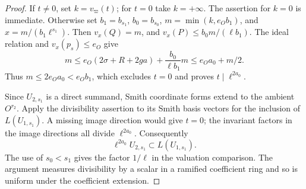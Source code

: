 \begin{proof}
If \(t\ne0\), set
\(k=v_\varpi(t)\); for \(t=0\) take \(k=+\infty\).
The assertion for \(k=0\) is immediate. Otherwise set
\(b_1=b_{s_1}\), \(b_0=b_{s_0}\),
\(m=\min(k,e_O b_1)\), and \(x=m/(b_1\ell^{s_1})\). Then
\(v_x(Q)=m\), and \(v_x(P)\le b_0 m/(\ell b_1)\).
The ideal relation and \(v_x(p_s)\le e_O\) give
\[
 m\le e_O(2\sigma+R+2ga)+\frac{b_0}{\ell b_1}m
   \le e_O a_0+m/2 .
\]
Thus \(m\le2e_Oa_0<e_Ob_1\), which excludes \(t=0\) and
proves \(t\mid\ell^{2a_0}\).

Since \(U_{2,s_1}\) is a direct
summand, Smith coordinate forms extend to the ambient
\(O^{r_2}\). Apply the divisibility assertion to its Smith
basis vectors for the inclusion of \(L(U_{1,s_1})\).
A missing image direction would give \(t=0\); the invariant
factors in the image directions all divide \(\ell^{2a_0}\).
Consequently
\[
                   \ell^{2a_0}U_{2,s_1}\subset L(U_{1,s_1}).
\]
The use of \(s_0<s_1\) gives the factor \(1/\ell\) in the
valuation comparison. The argument measures divisibility by a
scalar in a ramified coefficient ring and so is uniform under
the coefficient extension.
\end{proof}

